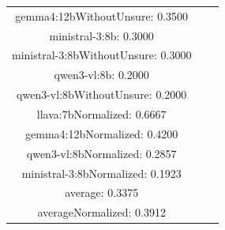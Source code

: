 \documentclass[a4paper]{article}
\begin{document}
\begin{tabular}{ccc}
gemma4:12bWithoutUnsure: 0.3500 \\ ministral-3:8b: 0.3000 \\ ministral-3:8bWithoutUnsure: 0.3000 \\ qwen3-vl:8b: 0.2000 \\ qwen3-vl:8bWithoutUnsure: 0.2000 \\ llava:7bNormalized: 0.6667 \\ gemma4:12bNormalized: 0.4200 \\ qwen3-vl:8bNormalized: 0.2857 \\ ministral-3:8bNormalized: 0.1923 \\ average: 0.3375 \\ averageNormalized: 0.3912 \end{minipage}\\
\end{tabular}

\vspace{5mm}
\end{document}
